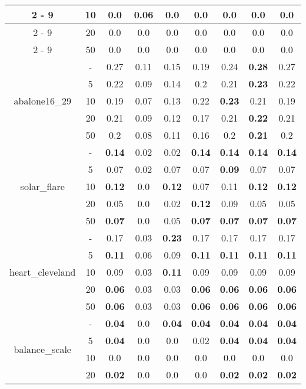 \documentclass{article}%
\begin{document}
\begin{tabular}{c|c|ccccccc}
\cline{2%
-%
9}%
&10&0.0&\textbf{0.06}&0.0&0.0&0.0&0.0&0.0\\%
\cline{2%
-%
9}%
&20&0.0&0.0&0.0&0.0&0.0&0.0&0.0\\%
\cline{2%
-%
9}%
&50&0.0&0.0&0.0&0.0&0.0&0.0&0.0\\%
\hline%
\multirow{5}{*}{abalone16\_29}&{-}&0.27&0.11&0.15&0.19&0.24&\textbf{0.28}&0.27\\%
\cline{2%
-%
9}%
&5&0.22&0.09&0.14&0.2&0.21&\textbf{0.23}&0.22\\%
\cline{2%
-%
9}%
&10&0.19&0.07&0.13&0.22&\textbf{0.23}&0.21&0.19\\%
\cline{2%
-%
9}%
&20&0.21&0.09&0.12&0.17&0.21&\textbf{0.22}&0.21\\%
\cline{2%
-%
9}%
&50&0.2&0.08&0.11&0.16&0.2&\textbf{0.21}&0.2\\%
\hline%
\multirow{5}{*}{solar\_flare}&{-}&\textbf{0.14}&0.02&0.02&\textbf{0.14}&\textbf{0.14}&\textbf{0.14}&\textbf{0.14}\\%
\cline{2%
-%
9}%
&5&0.07&0.02&0.07&0.07&\textbf{0.09}&0.07&0.07\\%
\cline{2%
-%
9}%
&10&\textbf{0.12}&0.0&\textbf{0.12}&0.07&0.11&\textbf{0.12}&\textbf{0.12}\\%
\cline{2%
-%
9}%
&20&0.05&0.0&0.02&\textbf{0.12}&0.09&0.05&0.05\\%
\cline{2%
-%
9}%
&50&\textbf{0.07}&0.0&0.05&\textbf{0.07}&\textbf{0.07}&\textbf{0.07}&\textbf{0.07}\\%
\hline%
\multirow{5}{*}{heart\_cleveland}&{-}&0.17&0.03&\textbf{0.23}&0.17&0.17&0.17&0.17\\%
\cline{2%
-%
9}%
&5&\textbf{0.11}&0.06&0.09&\textbf{0.11}&\textbf{0.11}&\textbf{0.11}&\textbf{0.11}\\%
\cline{2%
-%
9}%
&10&0.09&0.03&\textbf{0.11}&0.09&0.09&0.09&0.09\\%
\cline{2%
-%
9}%
&20&\textbf{0.06}&0.03&0.03&\textbf{0.06}&\textbf{0.06}&\textbf{0.06}&\textbf{0.06}\\%
\cline{2%
-%
9}%
&50&\textbf{0.06}&0.03&0.03&\textbf{0.06}&\textbf{0.06}&\textbf{0.06}&\textbf{0.06}\\%
\hline%
\multirow{5}{*}{balance\_scale}&{-}&\textbf{0.04}&0.0&\textbf{0.04}&\textbf{0.04}&\textbf{0.04}&\textbf{0.04}&\textbf{0.04}\\%
\cline{2%
-%
9}%
&5&\textbf{0.04}&0.0&0.0&0.02&\textbf{0.04}&\textbf{0.04}&\textbf{0.04}\\%
\cline{2%
-%
9}%
&10&0.0&0.0&0.0&0.0&0.0&0.0&0.0\\%
\cline{2%
-%
9}%
&20&\textbf{0.02}&0.0&0.0&0.0&\textbf{0.02}&\textbf{0.02}&\textbf{0.02}\\%

\end{tabular}
\end{document}
